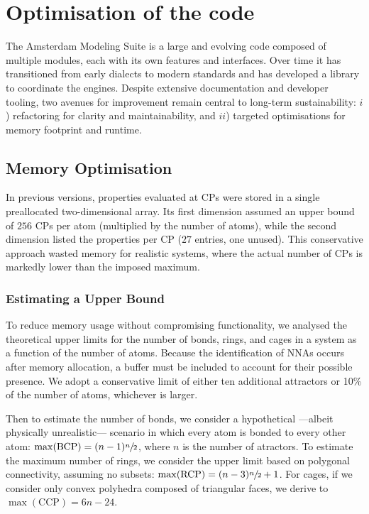 \newpage
\section{Optimisation of the code}

The Amsterdam Modeling Suite is a large and evolving code composed of
multiple modules, each with its own features and interfaces. Over time it
has transitioned from early \fortran dialects to modern standards and has
developed a \python library to coordinate the \ams
engines. Despite extensive documentation and developer tooling, two
avenues for improvement remain central to long-term sustainability:
$i$) refactoring for clarity and maintainability, and $ii$) targeted
optimisations for memory footprint and runtime.

\subsection{Memory Optimisation}

In previous versions, properties evaluated at \glspl{CP} were stored in a
single preallocated two-dimensional array. Its first dimension assumed an upper
bound of $256$ \glspl{CP} per atom (multiplied by the number of atoms), while
the second dimension listed the properties per \gls{CP} ($27$ entries, one
unused). This conservative approach wasted memory for realistic systems, where
the actual number of \glspl{CP} is markedly lower than the imposed maximum.

\subsubsection{Estimating a Upper Bound}

To reduce memory usage without compromising functionality, we analysed the
theoretical upper limits for the number of bonds, rings, and cages in a system
as a function of the number of atoms. Because the identification of \glspl{NNA}
occurs after memory allocation, a buffer must be included to account for their
possible presence. We adopt a conservative limit of either ten additional
attractors or 10\% of the number of atoms, whichever is larger.

Then to estimate the number of bonds, we consider a hypothetical ---albeit
physically unrealistic--- scenario in which every atom is bonded to every other
atom: $\max(\text{BCP}) = (n - 1)\sfrac{n}{2}$, \noindent where $n$ is the
number of atractors.  To estimate the maximum number of rings, we consider the
upper limit based on polygonal connectivity, assuming no subsets:
$\max(\text{RCP}) = (n - 3)\sfrac{n}{2} + 1$.  For cages, if we consider only
convex polyhedra composed of triangular faces, we derive to $\max(\text{CCP}) =
6n - 24$.

